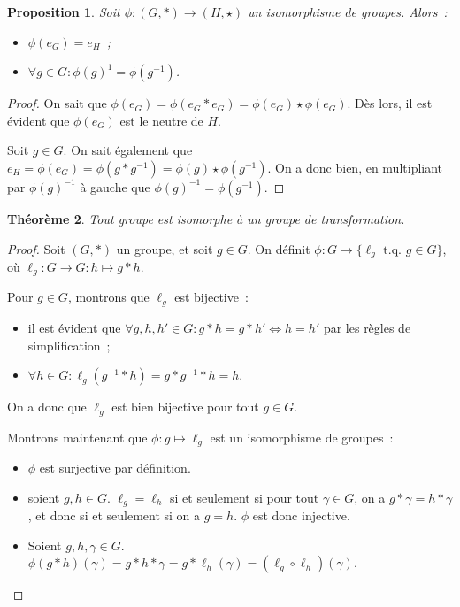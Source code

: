 \documentclass{article}
\newtheorem{thm}{Théorème}[section]
\newtheorem{prp}[thm]{Proposition}
\theoremstyle{definition}
\theoremstyle{remark}
\newcommand{\tq}{\text{ t.q. }}
\begin{document}
		\begin{prp}\label{prp:prop_isomorphisme} Soit $\phi : (G, *) \to (H, \star)$ un isomorphisme de groupes. Alors~:
		\begin{itemize}
			\item $\phi(e_G) = e_H$~;
			\item $\forall g \in G : \phi(g)^1 = \phi(g^{-1})$.
		\end{itemize}
		\end{prp}

		\begin{proof} On sait que $\phi(e_G) = \phi(e_G * e_G) = \phi(e_G) \star \phi(e_G)$. Dès lors, il est évident que $\phi(e_G)$ est le neutre de $H$.

		Soit $g \in G$. On sait également que $e_H = \phi(e_G) = \phi(g * g^{-1}) = \phi(g) \star \phi(g^{-1})$. On a donc bien, en multipliant par
		$\phi(g)^{-1}$ à gauche que $\phi(g)^{-1} = \phi(g^{-1})$.
		\end{proof}

		\begin{thm} Tout groupe est isomorphe à un groupe de transformation.
		\end{thm}

		\begin{proof} Soit $(G, *)$ un groupe, et soit $g \in G$. On définit $\phi : G \to \{\ell_g \tq g \in G\}$, où $\ell_g : G \to G : h \mapsto g*h$.

		Pour $g \in G$, montrons que $\ell_g$ est bijective~:
		\begin{itemize}
			\item il est évident que $\forall g, h, h' \in G : g*h = g*h' \iff h=h'$ par les règles de simplification~;
			\item $\forall h \in G : \ell_g(g^{-1}*h) = g*g^{-1}*h = h$.
		\end{itemize}

		On a donc que $\ell_g$ est bien bijective pour tout $g \in G$.

		Montrons maintenant que $\phi : g \mapsto \ell_g$ est un isomorphisme de groupes~:
		\begin{itemize}
			\item $\phi$ est surjective par définition.
			\item soient $g, h \in G$. $\ell_g = \ell_h$ si et seulement si pour tout $\gamma \in G$, on a $g*\gamma = h*\gamma$, et donc si et seulement si
			on a $g = h$. $\phi$ est donc injective.
			\item Soient $g, h, \gamma \in G$. $\phi(g * h)(\gamma) = g*h*\gamma = g*\ell_h(\gamma) = (\ell_g \circ \ell_h)(\gamma)$.
		\end{itemize}
		\end{proof}
\end{document}
